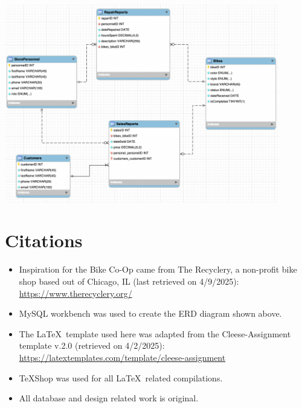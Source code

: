 \documentclass{article}
\begin{document}
\begin{tcolorbox}[colback=secondarycolor, colframe=primarycolor, arc=5mm]

\begin{center}
\vspace{0.5cm}
 \includegraphics[width=0.9\textwidth]{ERD.png}
\end{center}
\end{tcolorbox}

\vspace{0.5cm}

\section{Citations}
\begin{tcolorbox}[colback=secondarycolor, colframe=primarycolor, arc=5mm]
\begin{itemize}
  \item Inspiration for the Bike Co-Op came from The Recyclery, a non-profit bike shop based out of Chicago, IL (last retrieved on 4/9/2025): \href{https://www.therecyclery.org/}{https://www.therecyclery.org/}
  
  \vspace{0.2cm}
  
  \item MySQL workbench was used to create the ERD diagram shown above.
  
  \vspace{0.2cm}
  
  \item The \LaTeX\ template used here was adapted from the Cleese-Assignment template v.2.0 (retrieved on 4/2/2025): \href{https://latextemplates.com/template/cleese-assignment}{https://latextemplates.com/template/cleese-assignment}
  
  \vspace{0.2cm}
  
  \item TeXShop was used for all \LaTeX\ related compilations.
  
  \vspace{0.2cm}
  
  \item All database and design related work is original.
\end{itemize}
\end{tcolorbox}
\end{document}
